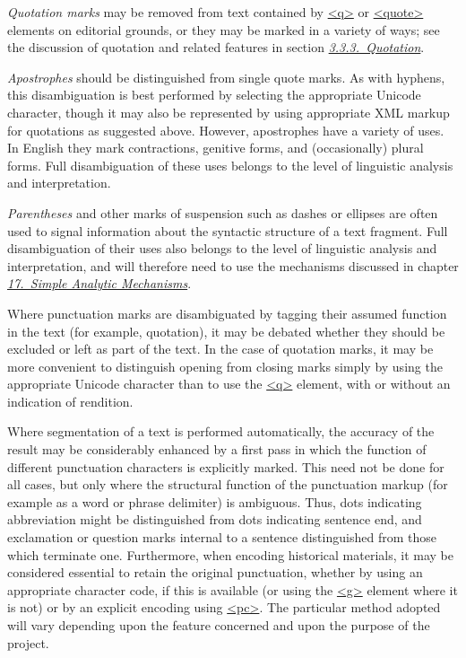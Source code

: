 \textit{Quotation marks} may be removed from text contained by \hyperref[TEI.q]{<q>} or \hyperref[TEI.quote]{<quote>} elements on editorial grounds, or they may be marked in a variety of ways; see the discussion of quotation and related features in section \textit{\hyperref[COHQQ]{3.3.3.\ Quotation}}.\par
\textit{Apostrophes} should be distinguished from single quote marks. As with hyphens, this disambiguation is best performed by selecting the appropriate Unicode character, though it may also be represented by using appropriate XML markup for quotations as suggested above. However, apostrophes have a variety of uses. In English they mark contractions, genitive forms, and (occasionally) plural forms. Full disambiguation of these uses belongs to the level of linguistic analysis and interpretation.\par
\textit{Parentheses} and other marks of suspension such as dashes or ellipses are often used to signal information about the syntactic structure of a text fragment. Full disambiguation of their uses also belongs to the level of linguistic analysis and interpretation, and will therefore need to use the mechanisms discussed in chapter \textit{\hyperref[AI]{17.\ Simple Analytic Mechanisms}}.\par
Where punctuation marks are disambiguated by tagging their assumed function in the text (for example, quotation), it may be debated whether they should be excluded or left as part of the text. In the case of quotation marks, it may be more convenient to distinguish opening from closing marks simply by using the appropriate Unicode character than to use the \hyperref[TEI.q]{<q>} element, with or without an indication of rendition.\par
Where segmentation of a text is performed automatically, the accuracy of the result may be considerably enhanced by a first pass in which the function of different punctuation characters is explicitly marked. This need not be done for all cases, but only where the structural function of the punctuation markup (for example as a word or phrase delimiter) is ambiguous. Thus, dots indicating abbreviation might be distinguished from dots indicating sentence end, and exclamation or question marks internal to a sentence distinguished from those which terminate one. Furthermore, when encoding historical materials, it may be considered essential to retain the original punctuation, whether by using an appropriate character code, if this is available (or using the \hyperref[TEI.g]{<g>} element where it is not) or by an explicit encoding using \hyperref[TEI.pc]{<pc>}. The particular method adopted will vary depending upon the feature concerned and upon the purpose of the project.
